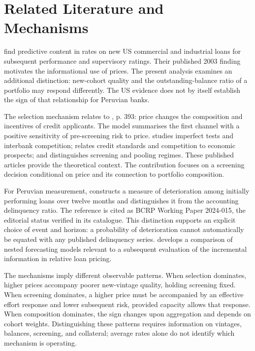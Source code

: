 \documentclass[11pt]{article}
\theoremstyle{definition}\newtheorem{assumption}{Assumption}
\begin{document}
\section{Related Literature and Mechanisms}
\citet{morgan2003} find predictive content in rates on new US commercial
and industrial loans for subsequent performance and supervisory ratings.
Their published 2003 finding motivates the informational use of prices.
The present analysis examines an additional distinction: new-cohort quality
and the outstanding-balance ratio of a portfolio may respond differently.
The US evidence does not by itself establish the sign of that relationship
for Peruvian banks.

The selection mechanism relates to \citet{stiglitz1981}, p. 393: price
changes the composition and incentives of credit applicants. The model
summarises the first channel with a positive sensitivity of pre-screening
risk to price. \citet{broecker1990} studies imperfect tests and interbank
competition; \citet{ruckes2004} relates credit standards and competition to
economic prospects; and \citet{dellariccia2006} distinguishes screening and
pooling regimes. These published articles provide the theoretical context.
The contribution focuses on a screening decision conditional on price and
its connection to portfolio composition.

For Peruvian measurement, \citet{yamunaque2024} constructs a measure of
deterioration among initially performing loans over twelve months and
distinguishes it from the accounting delinquency ratio. The reference is
cited as BCRP Working Paper 2024-015, the editorial status verified in its
catalogue. This distinction supports an explicit choice of event and horizon:
a probability of deterioration cannot automatically be equated with any
published delinquency series. \citet{clark2007} develops a comparison of
nested forecasting models relevant to a subsequent evaluation of the
incremental information in relative loan pricing.

The mechanisms imply different observable patterns. When selection
dominates, higher prices accompany poorer new-vintage quality, holding
screening fixed. When screening dominates, a higher price must be accompanied
by an effective effort response and lower subsequent risk, provided capacity
allows that response. When composition dominates, the sign changes upon
aggregation and depends on cohort weights. Distinguishing these patterns
requires information on vintages, balances, screening, and collateral;
average rates alone do not identify which mechanism is operating.
\end{document}
